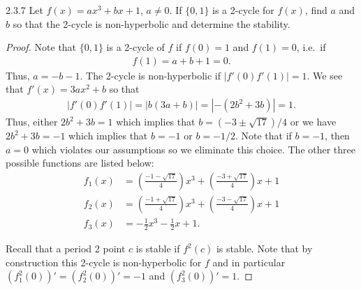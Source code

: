 \begin{problem}{2.3.7}
  Let $f(x) = ax^3 + bx + 1$, $a\neq 0$. If $\{0, 1\}$ is a 2-cycle for $f(x)$,
  find $a$ and $b$ so that the 2-cycle is non-hyperbolic and determine the stability.
\end{problem}

\begin{proof}
  Note that $\{0, 1\}$ is a 2-cycle of $f$ if $f(0) = 1$ and $f(1) = 0$, i.e.\ if
  \begin{align*}
    f(1) = a + b + 1 = 0.
  \end{align*}
  Thus, $a = -b - 1.$
  The 2-cycle is non-hyperbolic if $\left|f'(0)f'(1)\right| = 1$. We see that
  $f'(x) = 3a x^2 + b$ so that
  \begin{align*}
    \left|f'(0)f'(1)\right| = |b(3a + b)| = |-(2b^2 + 3b)| = 1.
  \end{align*}
  Thus, either $2b^2 + 3b = 1$ which implies that $b=(-3\pm\sqrt{17})/4$ or
  we have $2b^2 + 3b = -1$ which implies that $b=-1$ or $b=-1/2$. Note that if $b=-1$, then $a = 0$ which violates our
  assumptions
  so we eliminate this choice. The other three possible functions are listed below:
  \begin{align*}
    f_1(x) &= \left(\frac{-1 - \sqrt{17}}{4}\right)x^3 + \left(\frac{-3 + \sqrt{17}}{4}\right)x + 1 \\
    f_2(x) &= \left(\frac{-1 + \sqrt{17}}{4}\right)x^3 + \left(\frac{-3 - \sqrt{17}}{4}\right)x + 1 \\
    f_3(x) &= -\frac{1}{2} x^3 - \frac{1}{2} x + 1.
  \end{align*}

  Recall that a period 2 point $c$ is stable if $f^2(c)$ is stable. Note that by construction
  this 2-cycle is non-hyperbolic for $f$ and in particular $(f_1^2(0))' = (f_2^2(0))' = -1$
  and $(f_3^2(0))' = 1$.


\end{proof}
